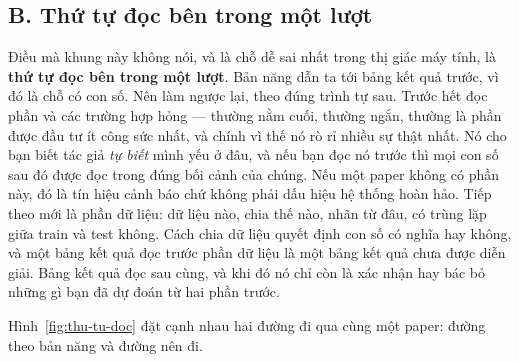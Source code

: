 \documentclass[../../deep_learning.tex]{subfiles}
\begin{document}
\subsection{B. Thứ tự đọc bên trong một lượt}
Điều mà khung này không nói, và là chỗ dễ sai nhất trong thị giác máy tính, là \textbf{thứ tự đọc bên trong một lượt}. Bản năng dẫn ta tới bảng kết quả trước, vì đó là chỗ có con số. Nên làm ngược lại, theo đúng trình tự sau. Trước hết đọc phần  và các trường hợp hỏng — thường nằm cuối, thường ngắn, thường là phần được đầu tư ít công sức nhất, và chính vì thế nó rò rỉ nhiều sự thật nhất. Nó cho bạn biết tác giả \emph{tự biết} mình yếu ở đâu, và nếu bạn đọc nó trước thì mọi con số sau đó được đọc trong đúng bối cảnh của chúng. Nếu một paper không có phần này, đó là tín hiệu cảnh báo chứ không phải dấu hiệu hệ thống hoàn hảo. Tiếp theo mới là phần dữ liệu: dữ liệu nào, chia thế nào, nhãn từ đâu, có trùng lặp giữa train và test không. Cách chia dữ liệu quyết định con số có nghĩa hay không, và một bảng kết quả đọc trước phần dữ liệu là một bảng kết quả chưa được diễn giải. Bảng kết quả đọc sau cùng, và khi đó nó chỉ còn là xác nhận hay bác bỏ những gì bạn đã dự đoán từ hai phần trước.

Hình~\ref{fig:thu-tu-doc} đặt cạnh nhau hai đường đi qua cùng một paper: đường theo bản năng và đường nên đi.
\end{document}
